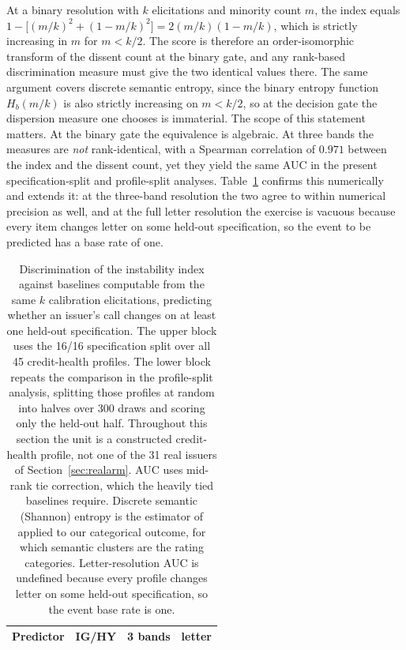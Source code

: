 \documentclass[a4paper,fleqn]{cas-sc}
\begin{document}
At a binary resolution with $k$ elicitations and minority count $m$, the index equals
$1-\big[(m/k)^2+(1-m/k)^2\big]=2(m/k)(1-m/k)$, which is strictly increasing in $m$ for $m<k/2$. The
score is therefore an order-isomorphic transform of the dissent count at the binary gate, and any
rank-based discrimination measure must give the two identical values there. The same argument covers
discrete semantic entropy, since the binary entropy function $H_b(m/k)$ is also strictly increasing
on $m<k/2$, so at the decision gate the dispersion measure one chooses is immaterial. The scope of
this statement matters. At the binary gate the equivalence is algebraic. At three bands the measures
are \emph{not} rank-identical, with a Spearman correlation of $0.971$ between the index and the
dissent count, yet they yield the same AUC in the present specification-split and profile-split
analyses. Table~\ref{tab:sisbase} confirms this
numerically and extends it: at the three-band resolution the two agree to within numerical
precision as well, and at the full letter resolution the exercise is vacuous because every item
changes letter on some held-out specification, so the event to be predicted has a base rate of one.

\begin{table}[t]\centering
\caption{Discrimination of the instability index against baselines computable from the same $k$
calibration elicitations, predicting whether an issuer's call changes on at least one held-out
specification. The upper block uses the 16/16 specification split over all 45 credit-health
profiles. The lower block repeats the comparison in the profile-split analysis, splitting those
profiles at random into halves over 300 draws and scoring only the held-out half. Throughout
this section the unit is a constructed credit-health profile, not one of the 31 real issuers of
Section~\ref{sec:realarm}. AUC uses mid-rank tie correction, which the
heavily tied baselines require. Discrete semantic (Shannon) entropy is the estimator of
\citet{farquhar2024semantic} applied to our categorical outcome, for which semantic clusters are
the rating categories. Letter-resolution AUC is undefined because every profile changes letter on
some held-out specification, so the event base rate is one.}
\label{tab:sisbase}
\begin{tabular}{lccc}\toprule
Predictor & IG/HY & 3 bands & letter \\\midrule%

\end{tabular}\end{table}
\end{document}
